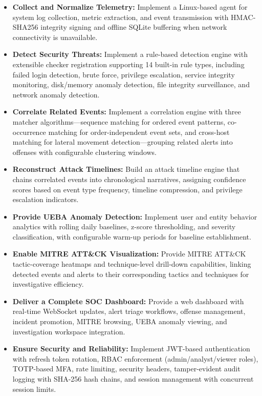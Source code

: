 \begin{itemize}
    \item \textbf{Collect and Normalize Telemetry:} Implement a Linux-based agent for system log collection, metric extraction, and event transmission with HMAC-SHA256 integrity signing and offline SQLite buffering when network connectivity is unavailable.
    \item \textbf{Detect Security Threats:} Implement a rule-based detection engine with extensible checker registration supporting 14 built-in rule types, including failed login detection, brute force, privilege escalation, service integrity monitoring, disk/memory anomaly detection, file integrity surveillance, and network anomaly detection.
    \item \textbf{Correlate Related Events:} Implement a correlation engine with three matcher algorithms—sequence matching for ordered event patterns, co-occurrence matching for order-independent event sets, and cross-host matching for lateral movement detection—grouping related alerts into offenses with configurable clustering windows.
    \item \textbf{Reconstruct Attack Timelines:} Build an attack timeline engine that chains correlated events into chronological narratives, assigning confidence scores based on event type frequency, timeline compression, and privilege escalation indicators.
    \item \textbf{Provide UEBA Anomaly Detection:} Implement user and entity behavior analytics with rolling daily baselines, z-score thresholding, and severity classification, with configurable warm-up periods for baseline establishment.
    \item \textbf{Enable MITRE ATT\&CK Visualization:} Provide MITRE ATT\&CK tactic-coverage heatmaps and technique-level drill-down capabilities, linking detected events and alerts to their corresponding tactics and techniques for investigative efficiency.
    \item \textbf{Deliver a Complete SOC Dashboard:} Provide a web dashboard with real-time WebSocket updates, alert triage workflows, offense management, incident promotion, MITRE browsing, UEBA anomaly viewing, and investigation workspace integration.
    \item \textbf{Ensure Security and Reliability:} Implement JWT-based authentication with refresh token rotation, RBAC enforcement (admin/analyst/viewer roles), TOTP-based MFA, rate limiting, security headers, tamper-evident audit logging with SHA-256 hash chains, and session management with concurrent session limits.
\end{itemize}

